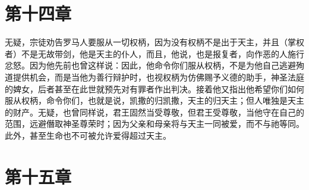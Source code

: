 
\section{第十四章}

无疑，宗徒劝告罗马人要服从一切权柄，因为没有权柄不是出于天主，并且（掌权者）不是无故带剑，他是天主的仆人，而且，他说，也是报复者，向作恶的人施行忿怒。因为他先前也曾这样说：因此，他命令你们服从权柄，不是为他自己逃避殉道提供机会，而是当他为善行辩护时，也视权柄为仿佛赐予义德的助手，神圣法庭的婢女，后者甚至在此世就预先对有罪者作出判决。接着他又指出他希望你们如何服从权柄，命令你们，也就是说，凯撒的归凯撒，天主的归天主；但人唯独是天主的财产。无疑，也曾同样说，君王固然当受尊敬，但君王受尊敬，当他守在自己的范围，远避僭取神圣尊荣时；因为父亲和母亲将与天主一同被爱，而不与祂等同。此外，甚至生命也不可被允许爱得超过天主。\par


\section{第十五章}

